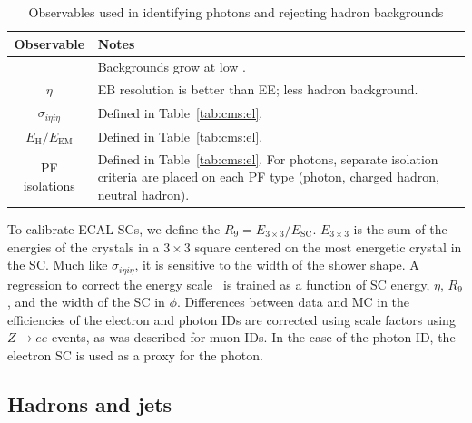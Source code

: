 \begin{table}
	\begin{center}
		\caption{Observables used in identifying photons and rejecting hadron backgrounds}
		\label{tab:cms:pho}
		\begin{tabular}{c|p{}}
			Observable & Notes \\ 
			\hline
			\hline
			\pt & Backgrounds grow at low \pt. \\ \hline
			$\eta$ & EB resolution is better than EE; less hadron background. \\ \hline
			$\sigma_{i\eta i\eta}$  & Defined in Table~\ref{tab:cms:el}. \\ \hline
			$E_\mathrm{H}/E_\mathrm{EM}$  & Defined in Table~\ref{tab:cms:el}. \\ \hline
			PF isolations & Defined in Table~\ref{tab:cms:el}. For photons, separate isolation criteria are placed on each PF type (photon, charged hadron, neutral hadron). \\ 
		\end{tabular}
	\end{center}
\end{table}

To calibrate ECAL SCs, we define the $R_9 = E_{3\times3}/E_\mathrm{SC}$. 
$E_{3\times3}$ is the sum of the energies of the crystals in a $3\times3$ square centered on the most energetic crystal in the SC. 
Much like $\sigma_{i\eta i\eta}$, it is sensitive to the width of the shower shape.
A regression to correct the energy scale~\cite{cmsecalreco} is trained as a function of SC energy, $\eta$, $R_9$, and the width of the SC in $\phi$.
Differences between data and MC in the efficiencies of the electron and photon IDs are corrected using scale factors using $Z\rightarrow ee$ events, as was described for muon IDs.
In the case of the photon ID, the electron SC is used as a proxy for the photon.

\subsection{Hadrons and jets}
\label{sec:cms:jets}

